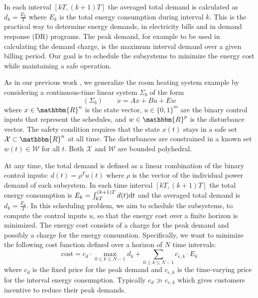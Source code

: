 In each interval $[kT, (k + 1) T]$ the averaged total demand is calculated as $d_k = \frac{E_k}{T}$ where $E_k$ is the total energy consumption during interval $k$.
This is the practical way to determine energy demands, \eg in electricity bills and in demand response (DR) programs.
The peak demand, for example to be used in calculating the demand charge, is the maximum interval demand over a given billing period. %
Our goal is to schedule the subsystems to minimize the energy cost %
while maintaining a safe operation.


As in our previous work \cite{nghiemetal12ssb}, we generalize the room heating system example by considering a continuous-time linear system $\Sigma_b$ of the form
%
\begin{equation*}
(\Sigma_b) \qquad \dot{x} = Ax + Bu + Ew
\end{equation*}
%
where $x \in \mathbbm{R}^{n}$ is the state vector, $u \in \{ 0, 1 \}^{m}$ are the binary control inputs that represent the schedules, and $w \in \mathbbm{R}^{p}$ is the disturbance vector.
The safety condition requires that the state $x (t)$ stays in a safe set $\mathcal{X} \subset \mathbbm{R}^n$ at all time.
The disturbances are constrained in a known set $w (t) \in \mathcal{W}$ for all $t$.
Both $\mathcal{X}$ and $\mathcal{W}$ are bounded polyhedral.

At any time, the total demand is defined as a linear combination of the binary
control inputs: $d (t) = \rho^T u (t)$ where $\rho$ is the vector of the individual
power demand of each subsystem. In each time interval $[kT, (k + 1) T]$ the
total energy consumption is $E_k = \int_{kT}^{(k + 1) T} d (t) \mathrm{d} t$ and
the averaged total demand is $d_k = \frac{E_k}{T}$. 
In this scheduling problem, we aim to schedule
the subsystems, \ie to compute the control inputs $u$, so that the energy cost over a finite horizon is minimized.
The energy cost consists of a charge for the peak demand and possibly a charge for the energy
consumtion.
Specifically, we want to minimize the following cost function defined over a horizon of $N$ time intervals:
\begin{equation}
  \label{eq:cost-function} \text{cost} = c_d \cdot \max_{0 \leqslant k
  \leqslant N - 1} d_k + \textstyle\sum_{0 \leqslant k \leqslant N - 1} c_{e, k} \cdot
  E_k
\end{equation}
where $c_d$ is the fixed price for the peak demand and $c_{e, k}$ is the
time-varying price for the interval energy consumption.
Typically $c_d \gg c_{e, k}$ which gives customers incentive to reduce their peak demands.


